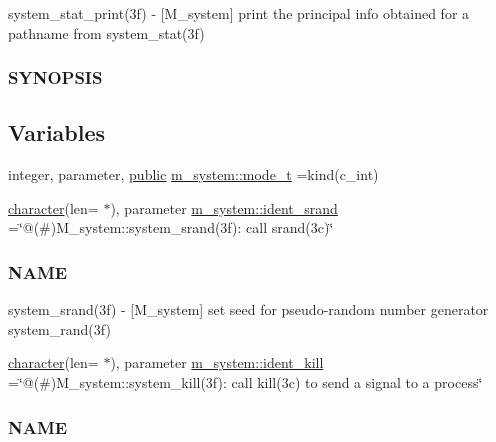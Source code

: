 \begin{DoxyCompactItemize}
\begin{DoxyCompactList}
system\+\_\+stat\+\_\+print(3f) -\/ \mbox{[}M\+\_\+system\mbox{]} print the principal info obtained for a pathname from system\+\_\+stat(3f) \subsubsection*{S\+Y\+N\+O\+P\+S\+IS}\end{DoxyCompactList}\end{DoxyCompactItemize}
\subsection*{Variables}
\begin{DoxyCompactItemize}
\item 
integer, parameter, \hyperlink{M__stopwatch_83_8txt_a2f74811300c361e53b430611a7d1769f}{public} \hyperlink{namespacem__system_abdb5cc27c945379d844db4830d499050}{m\+\_\+system\+::mode\+\_\+t} =kind(c\+\_\+int)
\item 
\hyperlink{option__stopwatch_83_8txt_abd4b21fbbd175834027b5224bfe97e66}{character}(len= $\ast$), parameter \hyperlink{namespacem__system_a3bdea86816bce4dced7f05da643b499a}{m\+\_\+system\+::ident\+\_\+srand} =\char`\"{}@(\#)M\+\_\+system\+::system\+\_\+srand(3f)\+: call srand(3c)\char`\"{}
\begin{DoxyCompactList}\small\item\em \subsubsection*{N\+A\+ME}

system\+\_\+srand(3f) -\/ \mbox{[}M\+\_\+system\mbox{]} set seed for pseudo-\/random number generator system\+\_\+rand(3f) \end{DoxyCompactList}\item 
\hyperlink{option__stopwatch_83_8txt_abd4b21fbbd175834027b5224bfe97e66}{character}(len= $\ast$), parameter \hyperlink{namespacem__system_a18b4c54ccbabc1d82affd798656ec9ae}{m\+\_\+system\+::ident\+\_\+kill} =\char`\"{}@(\#)M\+\_\+system\+::system\+\_\+kill(3f)\+: call kill(3c) to send a signal to a process\char`\"{}
\begin{DoxyCompactList}\small\item\em \subsubsection*{N\+A\+ME}


\end{DoxyCompactList}
\end{DoxyCompactItemize}
